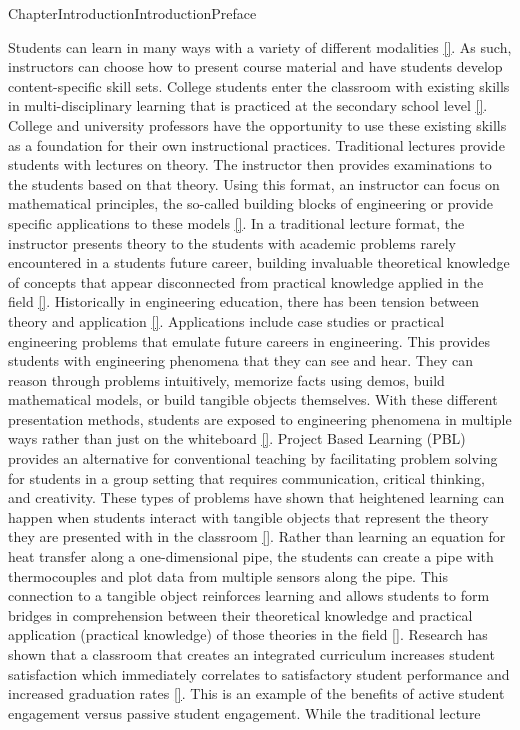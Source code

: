 \documentclass[oneside,10pt,]{book}
\newcommand{\xreffont}{\relax}
\newcommand{\linkhilite}[1]{\underline{#1}}
\numberwithin{equation}{section}
\begin{document}
\begin{chapterptx}{Chapter}{Introduction}{}{Introduction}{}{}{Preface}
\begin{introduction}{}
Students can learn in many ways with a variety of different modalities \hyperlink{Gardner}{\linkhilite{[{\xreffont 11}]}}. As such, instructors can choose how to present course material and have students develop content-specific skill sets. College students enter the classroom with existing skills in multi-disciplinary learning that is practiced at the secondary school level \hyperlink{Ralph}{\linkhilite{[{\xreffont 12}]}}. College and university professors have the opportunity to use these existing skills as a foundation for their own instructional practices. Traditional lectures provide students with lectures on theory. The instructor then provides examinations to the students based on that theory. Using this format, an instructor can focus on mathematical principles, the so-called building blocks of engineering or provide specific applications to these models \hyperlink{Learning-Styles}{\linkhilite{[{\xreffont 13}]}}. In a traditional lecture format, the instructor presents theory to the students with academic problems rarely encountered in a students future career, building invaluable theoretical knowledge of concepts that appear disconnected from practical knowledge applied in the field \hyperlink{Yong}{\linkhilite{[{\xreffont 14}]}}. Historically in engineering education, there has been tension between theory and application \hyperlink{PBL1}{\linkhilite{[{\xreffont 15}]}}. Applications include case studies or practical engineering problems that emulate future careers in engineering. This provides students with engineering phenomena that they can see and hear. They can reason through problems intuitively, memorize facts using demos, build mathematical models, or build tangible objects themselves. With these different presentation methods, students are exposed to engineering phenomena in multiple ways rather than just on the whiteboard \hyperlink{Learning-Styles}{\linkhilite{[{\xreffont 13}]}}. Project Based Learning (PBL) provides an alternative for conventional teaching by facilitating problem solving for students in a group setting that requires communication, critical thinking, and creativity. These types of problems have shown that heightened learning can happen when students interact with tangible objects that represent the theory they are presented with in the classroom \hyperlink{PBL-Book}{\linkhilite{[{\xreffont 16}]}}. Rather than learning an equation for heat transfer along a one-dimensional pipe, the students can create a pipe with thermocouples and plot data from multiple sensors along the pipe. This connection to a tangible object reinforces learning and allows students to form bridges in comprehension between their theoretical knowledge and practical application (practical knowledge) of those theories in the field \hyperlink{TANGIBLEINTERFACES}{\linkhilite{[{\xreffont 17}]}}. Research has shown that a classroom that creates an integrated curriculum increases student satisfaction which immediately correlates to satisfactory student performance and increased graduation rates \hyperlink{StudentSatisfaction}{\linkhilite{[{\xreffont 18}]}}. This is an example of the benefits of active student engagement versus passive student engagement. While the traditional lecture 
\end{introduction}
\end{chapterptx}
\end{document}
